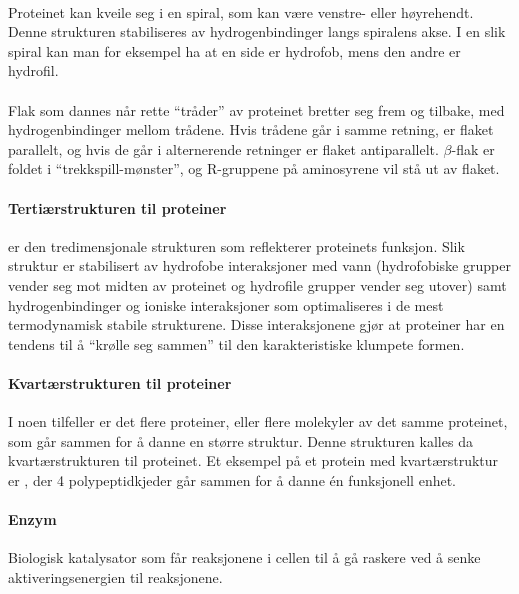\paragraph{} Proteinet kan kveile seg i en spiral, som kan være venstre- eller høyrehendt. Denne strukturen stabiliseres av hydrogenbindinger langs spiralens akse. I en slik spiral kan man for eksempel ha at en side er hydrofob, mens den andre er hydrofil.

\paragraph{} Flak som dannes når rette ``tråder'' av proteinet bretter seg frem og tilbake, med hydrogenbindinger mellom trådene. Hvis trådene går i samme retning, er flaket parallelt, og hvis de går i alternerende retninger er flaket antiparallelt. $\beta$-flak er foldet i ``trekkspill-mønster'', og R-gruppene på aminosyrene vil stå ut av flaket.

\paragraph{Tertiærstrukturen til proteiner} er den tredimensjonale strukturen som reflekterer proteinets funksjon. Slik struktur er stabilisert av hydrofobe interaksjoner med vann (hydrofobiske grupper vender seg mot midten av proteinet og hydrofile grupper vender seg utover) samt hydrogenbindinger og ioniske interaksjoner som optimaliseres i de mest termodynamisk stabile strukturene. Disse interaksjonene gjør at proteiner har en tendens til å ``krølle seg sammen'' til den karakteristiske klumpete formen.

\paragraph{Kvartærstrukturen til proteiner} I noen tilfeller er det flere proteiner, eller flere molekyler av det samme proteinet, som går sammen for å danne en større struktur. Denne strukturen kalles da kvartærstrukturen til proteinet. Et eksempel på et protein med kvartærstruktur er , der 4 polypeptidkjeder går sammen for å danne én funksjonell enhet.


\paragraph{Enzym} Biologisk katalysator som får reaksjonene i cellen til å gå raskere ved å senke aktiveringsenergien til reaksjonene.

